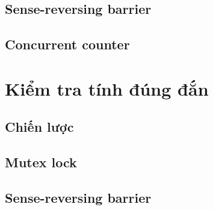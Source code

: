 \documentclass[a4paper]{article}
\begin{document}
\subsection{Sense-reversing barrier}

\subsection{Concurrent counter}

\section{Kiểm tra tính đúng đắn}

\subsection{Chiến lược}

\subsection{Mutex lock}

\subsection{Sense-reversing barrier}

\end{document}
